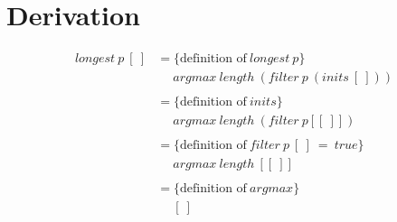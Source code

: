 \section{Derivation}
\begin{equation*}
\begin{split}
longest\: p \: [ \: ] &= \{\text{definition of}\: longest \: p\} \\ &\quad \; argmax \: length \: (filter \: p \: (inits \: [ \: ])) \\\\
&= \{\text{definition of}\: inits\} \\ &\quad \; argmax \: length \: (filter \: p [[ \: ]]) \\\\
&= \{\text{definition of}\: filter \: p\: [ \: ] \: = \: true\} \\ &\quad \; argmax \: length \: [[ \: ]] \\\\
&= \{\text{definition of}\: argmax\} \\ &\quad \; [ \: ]
\end{split}
\end{equation*}\\

